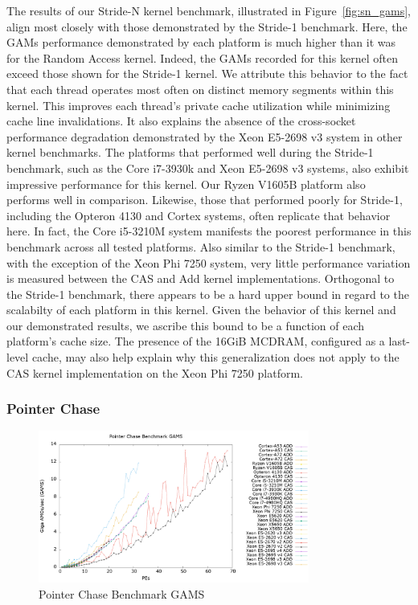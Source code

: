 The results of our Stride-N kernel benchmark, illustrated in Figure~\ref{fig:sn_gams}, align most closely with those demonstrated by the Stride-1 benchmark.
Here, the GAMs performance demonstrated by each platform is much higher than it was for the Random Access kernel.
Indeed, the GAMs recorded for this kernel often exceed those shown for the Stride-1 kernel.
We attribute this behavior to the fact that each thread operates most often on distinct memory segments within this kernel.
This improves each thread's private cache utilization while minimizing cache line invalidations.
It also explains the absence of the cross-socket performance degradation demonstrated by the Xeon E5-2698 v3 system in other kernel benchmarks.
The platforms that performed well during the Stride-1 benchmark, such as the Core i7-3930k and Xeon E5-2698 v3 systems, also exhibit impressive performance for this kernel.
Our Ryzen V1605B platform also performs well in comparison.
Likewise, those that performed poorly for Stride-1, including the Opteron 4130 and Cortex systems, often replicate that behavior here.
In fact, the Core i5-3210M system manifests the poorest performance in this benchmark across all tested platforms.
Also similar to the Stride-1 benchmark, with the exception of the Xeon Phi 7250 system, very little performance variation is measured between the CAS and Add kernel implementations.
Orthogonal to the Stride-1 benchmark, there appears to be a hard upper bound in regard to the scalabilty of each platform in this kernel.
Given the behavior of this kernel and our demonstrated results, we ascribe this bound to be a function of each platform's cache size.
The presence of the 16GiB MCDRAM, configured as a last-level cache, may also help explain why this generalization does not apply to the CAS kernel implementation on the Xeon Phi 7250 platform.

\subsubsection{Pointer Chase}
\label{subsubsec:ptrchase_res}

\begin{figure}[!t]
\centering
\includegraphics[width=3.5in]{figures/PTRCHASE_GAMS.png}
\caption{Pointer Chase Benchmark GAMS}
\label{fig:ptrchase_gams}
\end{figure}

